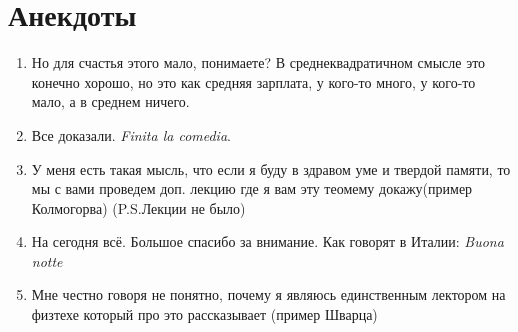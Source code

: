 \newpage
\section{Анекдоты}
\begin{enumerate}
    \item Но для счастья этого мало, понимаете? В среднеквадратичном смысле это конечно хорошо, но это как средняя зарплата, у кого-то много, у кого-то мало, а в среднем ничего.

    \item Все доказали. \textit{Finita la comedia}.

    \item У меня есть такая мысль, что если я буду в здравом уме и твердой памяти, то мы с вами проведем доп. лекцию где я вам эту теомему докажу(пример Колмогорва) (P.S.Лекции не было)

    \item На сегодня всё. Большое спасибо за внимание. Как говорят в Италии: \textit{Buona notte}

    \item Мне честно говоря не понятно, почему я являюсь единственным лектором на физтехе который про это рассказывает (пример Шварца)
\end{enumerate}